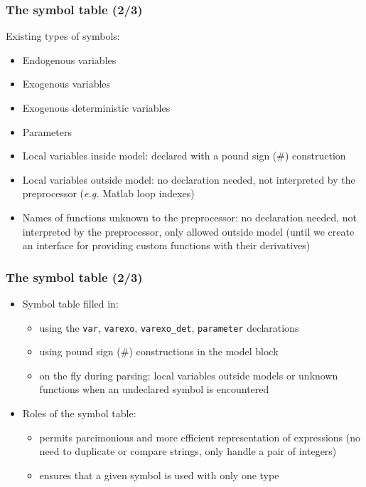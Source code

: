 \documentclass{beamer}
\begin{document}
\begin{frame}
  \frametitle{The symbol table (2/3)}
  Existing types of symbols:
  \begin{itemize}
  \item Endogenous variables
  \item Exogenous variables
  \item Exogenous deterministic variables
  \item Parameters
  \item Local variables inside model: declared with a pound sign (\#) construction
  \item Local variables outside model: no declaration needed, not interpreted by the preprocessor (\textit{e.g.} Matlab loop indexes)
  \item Names of functions unknown to the preprocessor: no declaration needed, not interpreted by the preprocessor, only allowed outside model (until we create an interface for providing custom functions with their derivatives)
  \end{itemize}
\end{frame}

\begin{frame}
  \frametitle{The symbol table (2/3)}
  \begin{itemize}
  \item Symbol table filled in:
    \begin{itemize}
    \item using the \texttt{var}, \texttt{varexo}, \texttt{varexo\_det}, \texttt{parameter} declarations
    \item using pound sign (\#) constructions in the model block
    \item on the fly during parsing: local variables outside models or unknown functions when an undeclared symbol is encountered
    \end{itemize}
  \item Roles of the symbol table:
    \begin{itemize}
    \item permits parcimonious and more efficient representation of expressions (no need to duplicate or compare strings, only handle a pair of integers)
    \item ensures that a given symbol is used with only one type
    \end{itemize}
  \end{itemize}
\end{frame}
\end{document}

